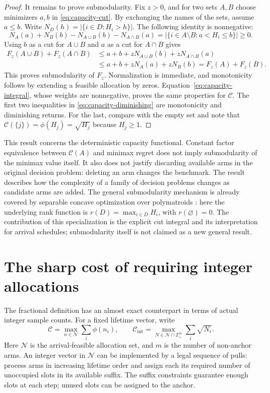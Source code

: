 \begin{proof}
It remains to prove submodularity. Fix $z>0$, and for two sets $A,B$
choose minimizers $a,b$ in \eqref{eq:capacity-cut}. By exchanging the
names of the sets, assume $a\le b$. Write
$N_D(h)=|\{i\in D:H_i>h\}|$. The following identity is nonnegative:
\[
 N_A(a)+N_B(b)-N_{A\cup B}(b)-N_{A\cap B}(a)
 =|\{i\in A\setminus B:a<H_i\le b\}|\ge0.
\]
Using $b$ as a cut for $A\cup B$ and $a$ as a cut for $A\cap B$ gives
\[
 \begin{split}
 F_z(A\cup B)+F_z(A\cap B)
 &\le a+b+zN_{A\cup B}(b)+zN_{A\cap B}(a)\\
 &\le a+b+zN_A(a)+zN_B(b)
 =F_z(A)+F_z(B).
 \end{split}
\]
This proves submodularity of $F_z$. Normalization is immediate, and
monotonicity follows by extending a feasible allocation by zeros.
Equation~\eqref{eq:capacity-integral}, whose weights are nonnegative,
proves the same properties for $\mathscr C$. The first two inequalities in
\eqref{eq:capacity-diminishing} are monotonicity and diminishing
returns. For the last, compare with the empty set and note that
$\mathscr C(\{j\})=\phi(H_j)=\sqrt{H_j}$ because $H_j\ge1$.
\end{proof}

This result concerns the deterministic capacity functional. Constant
factor equivalence between $\mathscr C(A)$ and minimax regret does not imply
submodularity of the minimax value itself. It also does not justify
discarding available arms in the original decision problem: deleting
an arm changes the benchmark. The result describes how the complexity
of a family of decision problems changes as candidate arms are added.
The general submodularity mechanism is already covered by separable
concave optimization over polymatroids \citep{he2012polymatroid}: here
the underlying rank function is $r(D)=\max_{i\in D}H_i$, with
$r(\varnothing)=0$. The contribution of this specialization is the
explicit cut integral and its interpretation for arrival schedules;
submodularity itself is not claimed as a new general result.

\section{The sharp cost of requiring integer allocations}
\label{sec:integer-capacity}

The fractional definition has an almost exact counterpart in terms of
actual integer sample counts. For a fixed lifetime vector, write
\[
 \mathscr C=\max_{n\in\mathcal N}\sum_i\phi(n_i),
 \qquad
 \mathscr C_{\mathrm{int}}
   =\max_{N\in\mathcal N\cap\mathbb Z_+^m}\sum_i\sqrt{N_i}.
\]
Here $\mathcal N$ is the arrival-feasible allocation set, and $m$ is the
number of non-anchor arms. An integer vector in $\mathcal N$ can be
implemented by a legal sequence of pulls: process arms in increasing
lifetime order and assign each its required number of unoccupied slots
in its available suffix. The suffix constraints guarantee enough slots
at each step; unused slots can be assigned to the anchor.

